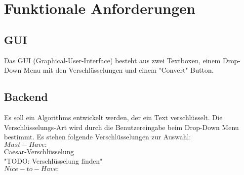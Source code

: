 \section{Funktionale Anforderungen}

\subsection{GUI}
Das GUI (Graphical-User-Interface) besteht aus zwei Textboxen, einem Drop-Down Menu mit den Verschlüsselungen und einem "Convert" Button.

\subsection{Backend}
Es soll ein Algorithms entwickelt werden, der ein Text verschlüsselt. Die Verschlüsselungs-Art wird durch die Benutzereingabe beim Drop-Down Menu bestimmt. Es stehen folgende Verschlüsselungen zur Auswahl:\\

$Must-Have:$\\
Caesar-Verschlüsselung\\
"TODO: Verschlüsselung finden"\\

$Nice-to-Have:$\\